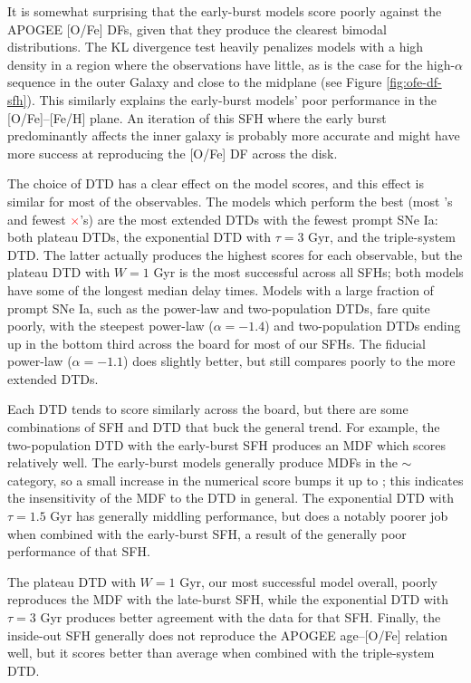 \documentclass[twocolumn,twocolappendix,linenumbers]{aastex631}
\newcommand{\yes}{\textcolor{green}{\checkmark}\xspace}
\newcommand{\meh}{\textcolor{black}{$\sim$}\xspace}
\newcommand{\no}{\textcolor{red}{$\times$}\xspace}
\begin{document}
It is somewhat surprising that the early-burst models score poorly against the APOGEE [O/Fe] DFs, given that they produce the clearest bimodal distributions. The KL divergence test heavily penalizes models with a high density in a region where the observations have little, as is the case for the high-$\alpha$ sequence in the outer Galaxy and close to the midplane (see Figure \ref{fig:ofe-df-sfh}). This similarly explains the early-burst models' poor performance in the [O/Fe]--[Fe/H] plane. An iteration of this SFH where the early burst predominantly affects the inner galaxy is probably more accurate and might have more success at reproducing the [O/Fe] DF across the disk.

The choice of DTD has a clear effect on the model scores, and this effect is similar for most of the observables. The models which perform the best (most \yes's and fewest \no's) are the most extended DTDs with the fewest prompt SNe Ia: both plateau DTDs, the exponential DTD with $\tau=3$ Gyr, and the triple-system DTD. The latter actually produces the highest scores for each observable, but the plateau DTD with $W=1$ Gyr is the most successful across all SFHs; both models have some of the longest median delay times. Models with a large fraction of prompt SNe Ia, such as the power-law and two-population DTDs, fare quite poorly, with the steepest power-law ($\alpha=-1.4$) and two-population DTDs ending up in the bottom third across the board for most of our SFHs. The fiducial power-law ($\alpha=-1.1$) does slightly better, but still compares poorly to the more extended DTDs.

Each DTD tends to score similarly across the board, but there are some combinations of SFH and DTD that buck the general trend. For example, the two-population DTD with the early-burst SFH produces an MDF which scores relatively well. The early-burst models generally produce MDFs in the \meh category, so a small increase in the numerical score bumps it up to \yes; this indicates the insensitivity of the MDF to the DTD in general. The exponential DTD with $\tau=1.5$ Gyr has generally middling performance, but does a notably poorer job when combined with the early-burst SFH, a result of the generally poor performance of that SFH. 

The plateau DTD with $W=1$ Gyr, our most successful model overall, poorly reproduces the MDF with the late-burst SFH, while the exponential DTD with $\tau=3$ Gyr produces better agreement with the data for that SFH. Finally, the inside-out SFH generally does not reproduce the APOGEE age--[O/Fe] relation well, but it scores better than average when combined with the triple-system DTD.
\end{document}
